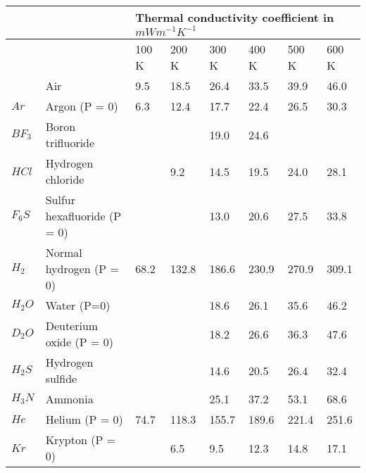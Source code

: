 \begin{table}[h]
\begin{center}
\tiny
\begin{tabular}{llllllll}
                            &                             & \multicolumn{6}{l}{Thermal conductivity coefficient in $mWm^{-1}K^{-1}$} \\ \hline
\multicolumn{1}{l|}{}       &                             & 100 K      & 200 K      & 300 K      & 400 K     & 500 K     & 600 K     \\ \hline
\multicolumn{1}{l|}{}       & Air                         & 9.5        & 18.5       & 26.4       & 33.5      & 39.9      & 46.0      \\
\multicolumn{1}{l|}{$Ar$}   & Argon (P = 0)               & 6.3        & 12.4       & 17.7       & 22.4      & 26.5      & 30.3      \\
\multicolumn{1}{l|}{$BF_3$} & Boron trifluoride           &            &            & 19.0       & 24.6      &           &           \\
\multicolumn{1}{l|}{$HCl$}  & Hydrogen chloride           &            & 9.2        & 14.5       & 19.5      & 24.0      & 28.1      \\
\multicolumn{1}{l|}{$F_6S$} & Sulfur hexafluoride (P = 0) &            &            & 13.0       & 20.6      & 27.5      & 33.8      \\
\multicolumn{1}{l|}{$H_2$}  & Normal hydrogen (P = 0)     & 68.2       & 132.8      & 186.6      & 230.9     & 270.9     & 309.1     \\
\multicolumn{1}{l|}{$H_2O$} & Water (P=0)                 &            &            & 18.6       & 26.1      & 35.6      & 46.2      \\
\multicolumn{1}{l|}{$D_2O$} & Deuterium oxide (P = 0)     &            &            & 18.2       & 26.6      & 36.3      & 47.6      \\
\multicolumn{1}{l|}{$H_2S$} & Hydrogen sulfide            &            &            & 14.6       & 20.5      & 26.4      & 32.4      \\
\multicolumn{1}{l|}{$H_3N$} & Ammonia                     &            &            & 25.1       & 37.2      & 53.1      & 68.6      \\
\multicolumn{1}{l|}{$He$}   & Helium (P = 0)              & 74.7       & 118.3      & 155.7      & 189.6     & 221.4     & 251.6     \\
\multicolumn{1}{l|}{$Kr$}   & Krypton (P = 0)             &            & 6.5        & 9.5        & 12.3      & 14.8      & 17.1      \\

\end{tabular}
\end{center}
\end{table}
